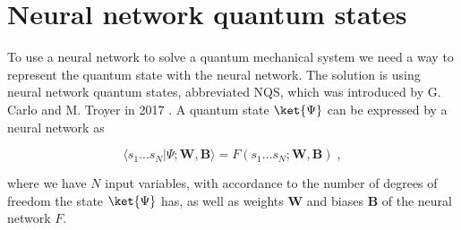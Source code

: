 \section{Neural network quantum states} \label{sec:nnqs} 

To use a neural network to solve a quantum mechanical system we need a way to represent the quantum state with the neural network. The solution is using neural network quantum states, abbreviated NQS, which was introduced by G. Carlo and M. Troyer in 2017 \cite{Carleo_2017}. A quantum state $\ket{\Psi}$ can be expressed by a neural network as

\begin{equation}
    \langle s_{1}\ldots s_{N}|\Psi ;\boldsymbol{W}, \boldsymbol{B}\rangle =F(s_{1}\ldots s_{N} ; \boldsymbol{W}, \boldsymbol{B} ) \; ,
\end{equation}

where we have $N$ input variables, with accordance to the number of degrees of freedom the state $\ket{\Psi}$ has, as well as weights $\boldsymbol{W}$ and biases $\boldsymbol{B}$ of the neural network $F$.
